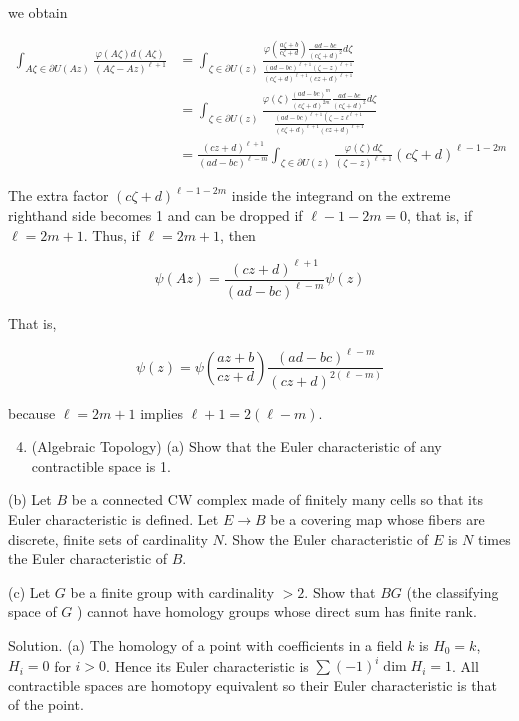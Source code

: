 \documentclass[10pt]{article}
\begin{document}
we obtain

$$
\begin{aligned}
\int_{A \zeta \in \partial U(A z)} \frac{\varphi(A \zeta) d(A \zeta)}{(A \zeta-A z)^{\ell+1}} & =\int_{\zeta \in \partial U(z)} \frac{\varphi\left(\frac{a \zeta+b}{c \zeta+d}\right) \frac{a d-b c}{(c \zeta+d)^{2}} d \zeta}{\frac{(a d-b c)^{\ell+1}(\zeta-z)^{\ell+1}}{(c \zeta+d)^{\ell+1}(c z+d)^{\ell+1}}} \\
& =\int_{\zeta \in \partial U(z)} \frac{\varphi(\zeta) \frac{(a d-b c)^{m}}{(c \zeta+d)^{2 m}} \frac{a d-b c}{(c \zeta+d)^{2}} d \zeta}{\frac{(a d-b c)^{\ell+1}\left(\zeta-z \ell^{\ell+1}\right.}{(c \zeta+d)^{\ell+1}(c z+d)^{\ell+1}}} \\
& =\frac{(c z+d)^{\ell+1}}{(a d-b c)^{\ell-m}} \int_{\zeta \in \partial U(z)} \frac{\varphi(\zeta) d \zeta}{(\zeta-z)^{\ell+1}}(c \zeta+d)^{\ell-1-2 m}
\end{aligned}
$$

The extra factor $(c \zeta+d)^{\ell-1-2 m}$ inside the integrand on the extreme righthand side becomes 1 and can be dropped if $\ell-1-2 m=0$, that is, if $\ell=2 m+1$. Thus, if $\ell=2 m+1$, then

$$
\psi(A z)=\frac{(c z+d)^{\ell+1}}{(a d-b c)^{\ell-m}} \psi(z)
$$

That is,

$$
\psi(z)=\psi\left(\frac{a z+b}{c z+d}\right) \frac{(a d-b c)^{\ell-m}}{(c z+d)^{2(\ell-m)}}
$$

because $\ell=2 m+1$ implies $\ell+1=2(\ell-m)$.

\begin{enumerate}
  \setcounter{enumi}{3}
  \item (Algebraic Topology) (a) Show that the Euler characteristic of any contractible space is 1.
\end{enumerate}

(b) Let $B$ be a connected $\mathrm{CW}$ complex made of finitely many cells so that its Euler characteristic is defined. Let $E \rightarrow B$ be a covering map whose fibers are discrete, finite sets of cardinality $N$. Show the Euler characteristic of $E$ is $N$ times the Euler characteristic of $B$.

(c) Let $G$ be a finite group with cardinality $>2$. Show that $B G$ (the classifying space of $G$ ) cannot have homology groups whose direct sum has finite rank.

Solution. (a) The homology of a point with coefficients in a field $k$ is $H_{0}=k$, $H_{i}=0$ for $i>0$. Hence its Euler characteristic is $\sum(-1)^{i} \operatorname{dim} H_{i}=1$. All contractible spaces are homotopy equivalent so their Euler characteristic is that of the point.
\end{document}
